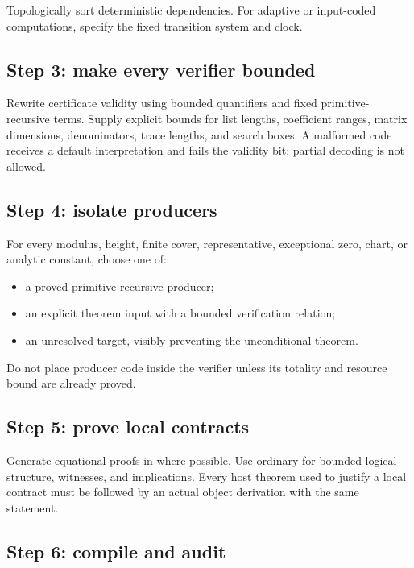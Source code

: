 Topologically sort deterministic dependencies.  For adaptive or input-coded computations, specify the fixed transition system and clock.

\subsection{Step 3: make every verifier bounded}

Rewrite certificate validity using bounded quantifiers and fixed primitive-recursive terms.  Supply explicit bounds for list lengths, coefficient ranges, matrix dimensions, denominators, trace lengths, and search boxes.  A malformed code receives a default interpretation and fails the validity bit; partial decoding is not allowed.

\subsection{Step 4: isolate producers}

For every modulus, height, finite cover, representative, exceptional zero, chart, or analytic constant, choose one of:

\begin{itemize}
  \item a proved primitive-recursive producer;
  \item an explicit theorem input with a bounded verification relation;
  \item an unresolved target, visibly preventing the unconditional theorem.
\end{itemize}

Do not place producer code inside the verifier unless its totality and resource bound are already proved.

\subsection{Step 5: prove local contracts}

Generate equational proofs in  where possible.  Use ordinary  for bounded logical structure, witnesses, and implications.  Every host theorem used to justify a local contract must be followed by an actual object derivation with the same statement.

\subsection{Step 6: compile and audit}


